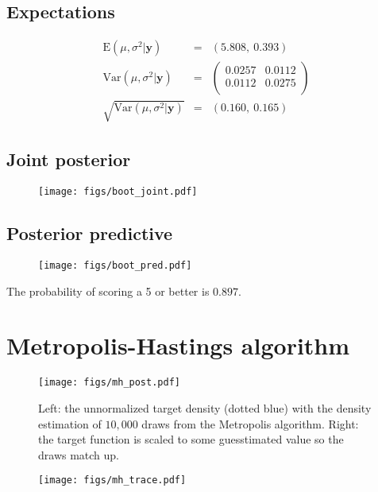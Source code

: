 \documentclass[12pt]{article}
\newcommand{\m}[1]{\mathbf{\bm{#1}}}
\begin{document}
\subsection{Expectations}

\begin{eqnarray*}
\mathrm{E}(\mu,\sigma^2|\m{y}) &=& (5.808,~0.393) \\
\mathrm{Var}(\mu, \sigma^2|\m{y}) &=& \left(\begin{array}{ll} 0.0257 & 0.0112 \\ 0.0112 & 0.0275 \\ \end{array}\right) \\
\sqrt{\mathrm{Var}(\mu, \sigma^2|\m{y})} &=& (0.160,~0.165)
\end{eqnarray*}

\subsection{Joint posterior}

\begin{figure}[H]
    \centering
    \texttt{[image: figs/boot\_joint.pdf]}
    \caption*{}
\end{figure}


\subsection{Posterior predictive}

\begin{figure}[H]
    \centering
    \texttt{[image: figs/boot\_pred.pdf]}
    \caption*{}
\end{figure}

\noindent The probability of scoring a 5 or better is $0.897$.

\section{Metropolis-Hastings algorithm}

\begin{figure}[H]
    \centering
    \texttt{[image: figs/mh\_post.pdf]}
    \caption*{Left: the unnormalized target density (dotted blue) with the density estimation of $10,000$ draws from the Metropolis algorithm. Right: the target function is scaled to some guesstimated value so the draws match up.}
\end{figure}

\begin{figure}[H]
    \centering
    \texttt{[image: figs/mh\_trace.pdf]}
    \caption*{}
\end{figure}
\end{document}
